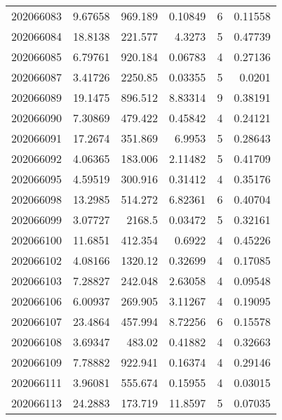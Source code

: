 \begin{tabular}{rrrrrr}
 202066083 &          9.67658 &      969.189  &            0.10849 &           6 & 0.11558 \\
 202066084 &         18.8138  &      221.577  &            4.3273  &           5 & 0.47739 \\
 202066085 &          6.79761 &      920.184  &            0.06783 &           4 & 0.27136 \\
 202066087 &          3.41726 &     2250.85   &            0.03355 &           5 & 0.0201  \\
 202066089 &         19.1475  &      896.512  &            8.83314 &           9 & 0.38191 \\
 202066090 &          7.30869 &      479.422  &            0.45842 &           4 & 0.24121 \\
 202066091 &         17.2674  &      351.869  &            6.9953  &           5 & 0.28643 \\
 202066092 &          4.06365 &      183.006  &            2.11482 &           5 & 0.41709 \\
 202066095 &          4.59519 &      300.916  &            0.31412 &           4 & 0.35176 \\
 202066098 &         13.2985  &      514.272  &            6.82361 &           6 & 0.40704 \\
 202066099 &          3.07727 &     2168.5    &            0.03472 &           5 & 0.32161 \\
 202066100 &         11.6851  &      412.354  &            0.6922  &           4 & 0.45226 \\
 202066102 &          4.08166 &     1320.12   &            0.32699 &           4 & 0.17085 \\
 202066103 &          7.28827 &      242.048  &            2.63058 &           4 & 0.09548 \\
 202066106 &          6.00937 &      269.905  &            3.11267 &           4 & 0.19095 \\
 202066107 &         23.4864  &      457.994  &            8.72256 &           6 & 0.15578 \\
 202066108 &          3.69347 &      483.02   &            0.41882 &           4 & 0.32663 \\
 202066109 &          7.78882 &      922.941  &            0.16374 &           4 & 0.29146 \\
 202066111 &          3.96081 &      555.674  &            0.15955 &           4 & 0.03015 \\
 202066113 &         24.2883  &      173.719  &           11.8597  &           5 & 0.07035 \\

\end{tabular}
